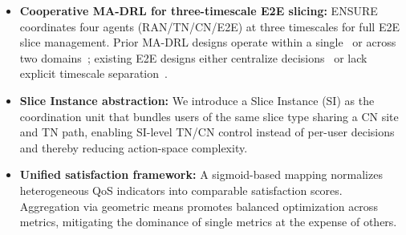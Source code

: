 \documentclass[12pt,lettersize,journal,onecolumn]{IEEEtran}
\begin{document}
\begin{itemize}[leftmargin=1.1em,labelsep=0.3em]
\item \textbf{Cooperative MA-DRL for three-timescale E2E slicing:} ENSURE coordinates four agents (RAN/TN/CN/E2E) at three timescales for full E2E slice management. Prior MA-DRL designs operate within a single~\cite{dyspan26mohammadi,jsac24zangooei} or across two domains~\cite{access21kim,tnsm22sulaiman}; existing E2E designs either centralize decisions~\cite{tnse25nouruzi} or lack explicit timescale separation~\cite{mnet23liu}.

\item \textbf{Slice Instance abstraction:} We introduce a Slice Instance (SI) as the coordination unit that bundles users of the same slice type sharing a CN site and TN path, enabling SI-level TN/CN control instead of per-user decisions and thereby reducing action-space complexity. 

\item \textbf{Unified satisfaction framework:} A sigmoid-based mapping normalizes heterogeneous QoS indicators into comparable satisfaction scores. Aggregation via geometric means promotes balanced optimization across metrics, mitigating the dominance of single metrics at the expense of others.


\end{itemize}
\end{document}
